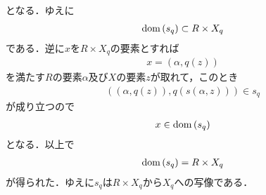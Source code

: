 \begin{sketch}
\begin{description}
				となる．ゆえに
				\begin{align}
					\operatorname*{dom} \left(s_q\right) \subset R \times X_q
				\end{align}
				である．逆に$x$を$R \times X_q$の要素とすれば
				\begin{align}
					x = \left(\alpha,q(z)\right)
				\end{align}
				を満たす$R$の要素$\alpha$及び$X$の要素$z$が取れて，このとき
				\begin{align}
					\left(\left(\alpha,q(z)\right),q\left(s(\alpha,z)\right)\right) \in s_q
				\end{align}
				が成り立つので
				\begin{align}
					x \in \operatorname*{dom} \left(s_q\right)
				\end{align}
				となる．以上で
				\begin{align}
					\operatorname*{dom} \left(s_q\right) = R \times X_q
				\end{align}
				が得られた．ゆえに$s_q$は$R \times X_q$から$X_q$への写像である．
				

\end{description}
\end{sketch}
